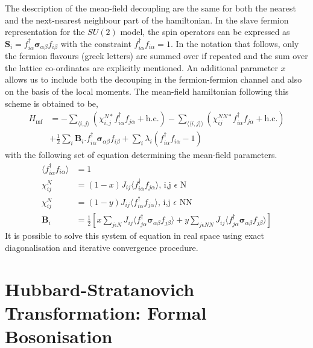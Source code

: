 \documentclass[notitlepage,onecolumn,showpacs,11pt]{revtex4-1}
\begin{document}
The description of the mean-field decoupling are the same for both the nearest
and the next-nearest neighbour part of the hamiltonian. In the slave fermion
representation for the $ SU(2) $ model, the spin operators can be expressed as
$\bm{S}_i=f_{i\alpha}^\dagger\bm{\sigma}_{\alpha\beta}f_{i\beta}$ with the 
constraint $f^\dagger_{i\alpha}f_{i\alpha}=1$. In the notation that follows, 
only the fermion flavours (greek letters) are summed over if repeated and
the sum over the lattice co-ordinates are explicitly mentioned. An additional
parameter $x$ allows us to include both the decouping in the fermion-fermion
channel and also on the basis of the local moments. The mean-field hamiltonian 
following this scheme is obtained to be,
\begin{equation}
	\begin{aligned}
		H_{\text{mf}}&=-\sum_{\langle i,j\rangle}
		\left(\chi^{N*}_{i,j}
			f^\dagger_{i\alpha}f_{j\alpha}
		+\text{h.c.}\right)-\sum_{\langle\langle i,j\rangle\rangle}
		\left(\chi^{NN*}_{ij}
			f^\dagger_{i\alpha}f_{j\alpha}
		+\text{h.c.}\right)\\ 
		&+\frac{1}{2}\sum_{i}\boldsymbol{B}_i.f_{i\alpha}^\dagger\bm{\sigma}_{\alpha\beta}
		f_{i\beta}
		+\sum_i\lambda_i\left(f^\dagger_{i\alpha}f_{i\alpha}-1\right)
	\end{aligned}
\end{equation}
with the following set of equation determining the mean-field parameters.
\begin{equation}
	\begin{aligned}
		\langle f^\dagger_{i\alpha}f_{i\alpha}\rangle &= 1 \\
		\chi_{ij}^{N}&=(1-x)J_{ij}\langle f^\dagger_{i\alpha}f_{j\alpha}\rangle
		\text{,\ \ i,j \ }\epsilon\text{ \ N}   \\
		\chi_{ij}^{N}&=(1-y)J_{ij}\langle f^\dagger_{i\alpha}f_{j\alpha}\rangle 
		\text{,\ \ i,j \ }\epsilon\text{ \ NN}   \\
		\boldsymbol{B}_i&=\frac{1}{2}
		\left[ x\sum_{j\epsilon N}
			J_{ij}\langle f_{j\alpha}^\dagger\bm{\sigma}_{\alpha\beta}f_{j\beta}\rangle
			+ y\sum_{j \epsilon NN}
		J_{ij}\langle f_{j\alpha}^\dagger\bm{\sigma}_{\alpha\beta}f_{j\beta}\rangle\right]
	\end{aligned}
\end{equation}
It is possible to solve this system of equation in real space using exact diagonalisation 
and iterative convergence procedure.

\section{Hubbard-Stratanovich Transformation: Formal Bosonisation}
\end{document}
